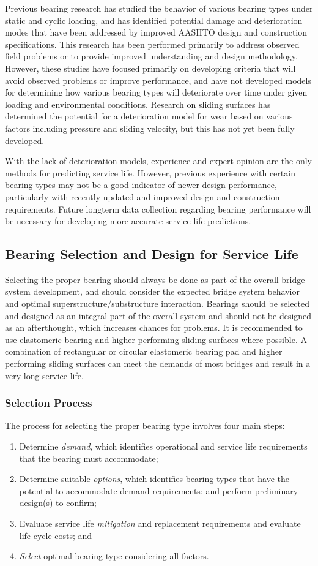 Previous bearing research has studied the behavior of various bearing types under static and cyclic loading, and
has identified potential damage and deterioration modes that have been addressed by improved AASHTO design and
construction specifications. This research has been performed primarily to address observed field problems or to
provide improved understanding and design methodology. However, these studies have focused primarily on
developing criteria that will avoid observed problems or improve performance, and have not developed models for
determining how various bearing types will deteriorate over time under given loading and environmental conditions.
Research on sliding surfaces has determined the potential for a deterioration model for wear based on various factors
including pressure and sliding velocity, but this has not yet been fully developed.

With the lack of deterioration models, experience and expert opinion are the only methods for predicting service
life. However, previous experience with certain bearing types may not be a good indicator of newer design
performance, particularly with recently updated and improved design and construction requirements. Future longterm
data collection regarding bearing performance will be necessary for developing more accurate service life
predictions.

\subsection{Bearing Selection and Design for Service Life}
Selecting the proper bearing should always be done as part of the overall bridge system development, and should
consider the expected bridge system behavior and optimal superstructure/substructure interaction. Bearings should
be selected and designed as an integral part of the overall system and should not be designed as an afterthought,
which increases chances for problems. It is recommended to use elastomeric bearing and higher performing sliding
surfaces where possible. A combination of rectangular or circular elastomeric bearing pad and higher performing
sliding surfaces can meet the demands of most bridges and result in a very long service life.

\subsubsection{Selection Process}
The process for selecting the proper bearing type involves four main steps:
\begin{enumerate}
  \item Determine \emph{demand}, which identifies operational and service life requirements that the bearing must accommodate;
  \item Determine suitable \emph{options}, which identifies bearing types that have the potential to accommodate demand requirements; and perform preliminary design(s) to confirm;
  \item Evaluate service life \emph{mitigation} and replacement requirements and evaluate life cycle costs; and
  \item \emph{Select} optimal bearing type considering all factors.
\end{enumerate}

